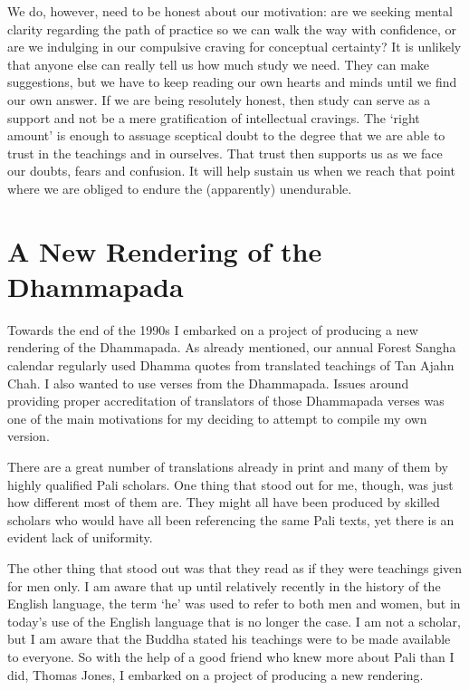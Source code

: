 We do, however, need to be honest about our motivation: are we seeking
mental clarity regarding the path of practice so we can walk the way
with confidence, or are we indulging in our compulsive craving for
conceptual certainty? It is unlikely that anyone else can really tell us
how much study we need. They can make suggestions, but we have to keep
reading our own hearts and minds until we find our own answer. If we are
being resolutely honest, then study can serve as a support and not be a
mere gratification of intellectual cravings. The `right amount' is
enough to assuage sceptical doubt to the degree that we are able to
trust in the teachings and in ourselves. That trust then supports us as
we face our doubts, fears and confusion. It will help sustain us when we
reach that point where we are obliged to endure the (apparently)
unendurable.

\section{A New Rendering of the Dhammapada}

Towards the end of the 1990s I embarked on a project of producing a new
rendering of the Dhammapada\cite{dhammapada}.
As already mentioned, our annual Forest Sangha calendar
regularly used Dhamma quotes from translated teachings of Tan Ajahn
Chah. I also wanted to use verses from the Dhammapada. Issues around
providing proper accreditation of translators of those Dhammapada verses
was one of the main motivations for my deciding to attempt to compile my
own version.

There are a great number of translations already in print and many of
them by highly qualified Pali scholars. One thing that stood out for me,
though, was just how different most of them are. They might all have
been produced by skilled scholars who would have all been referencing
the same Pali texts, yet there is an evident lack of uniformity.

The other thing that stood out was that they read as if they were
teachings given for men only. I am aware that up until relatively
recently in the history of the English language, the term `he' was used
to refer to both men and women, but in today's use of the English
language that is no longer the case. I am not a scholar, but I am aware
that the Buddha stated his teachings were to be made available to
everyone. So with the help of a good friend who knew more about Pali than I did, Thomas Jones, I embarked on a project of producing a new rendering.

